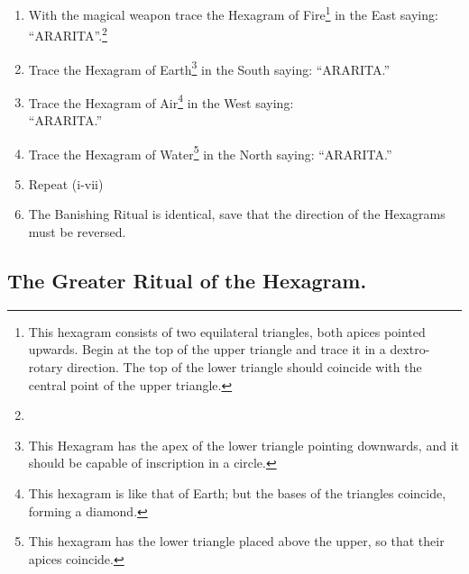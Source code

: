 \begin{enumerate}[label=(\textit{\Roman*})]
\item With the magical weapon trace the Hexagram of Fire\footnote{This hexagram consists of two equilateral triangles, both apices pointed upwards. Begin at the top of the upper triangle and trace it in a dextro-rotary direction. The top of the lower triangle should coincide with the central point of the upper triangle.} in the East saying: \enquote{ARARITA}.\footnote{\footnotemark}
\item Trace the Hexagram of Earth\footnote{This Hexagram has the apex of the lower triangle pointing downwards, and it should be capable of inscription in a circle.} in the South saying: \enquote{ARARITA.}
\item Trace the Hexagram of Air\footnote{This hexagram is like that of Earth; but the bases of the triangles coincide, forming a diamond.} in the West saying: \\ \enquote{ARARITA.}
\item Trace the Hexagram of Water\footnote{This hexagram has the lower triangle placed above the upper, so that their apices coincide.} in the North saying: \enquote{ARARITA.}
\item Repeat (i-vii)
\item[] The Banishing Ritual is identical, save that the direction of the Hexagrams must be reversed.
\end{enumerate}

\subsection*{The Greater Ritual of the Hexagram.}
{\centering
{}\par
}

